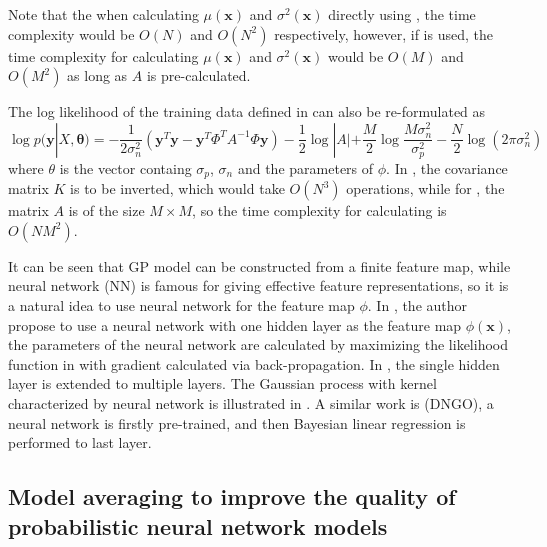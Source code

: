 Note that the when calculating $\mu(\bm{x})$ and $\sigma^2(\bm{x})$ directly using , the time complexity would be $O(N)$ and $O(N^2)$ respectively, however, if  is used, the time complexity for calculating $\mu(\bm{x})$ and $\sigma^2(\bm{x})$ would be $O(M)$ and $O(M^2)$ as long as $A$ is pre-calculated.

The log likelihood of the training data defined in  can also be re-formulated\cite{lazaro2010marginalized} as\:
\begin{equation}
    \label{eq:DegenerateGPloglikelihood}
    \log p(\bm{y} | X, \bm{\theta}) = -\frac{1}{2\sigma_n^2}(\bm{y}^T\bm{y} - \bm{y}^T \Phi^T A^{-1} \Phi \bm{y}) - \frac{1}{2}\log |A| + \frac{M}{2} \log \frac{M \sigma_n^2}{\sigma_p^2} - \frac{N}{2} \log(2 \pi \sigma_n^2)
\end{equation}
where $\theta$ is the vector containg $\sigma_p$, $\sigma_n$ and the parameters of $\phi$. In , the covariance matrix $K$ is to be inverted, which would take $O(N^3)$ operations, while for , the matrix $A$ is of the size $M \times M$, so the time complexity for calculating  is $O(NM^2)$. 

It can be seen that GP model can be constructed from a finite feature map, while neural network (NN) is famous for giving effective feature representations, so it is a natural idea to use neural network for the feature map $\phi$. In \cite{lazaro2010marginalized}, the author propose to use a neural network with one hidden layer as the feature map $\phi(\bm{x})$, the parameters of the neural network are calculated by maximizing the likelihood function in  with gradient calculated via back-propagation. In \cite{huang2015scalable}, the single hidden layer is extended to multiple layers. The Gaussian process with kernel characterized by neural network is illustrated in . A similar work is (DNGO), a neural network is firstly pre-trained, and then Bayesian linear regression is performed to last layer. 

\subsection{Model averaging to improve the quality of probabilistic neural network models}\label{sec:deepensemble}

